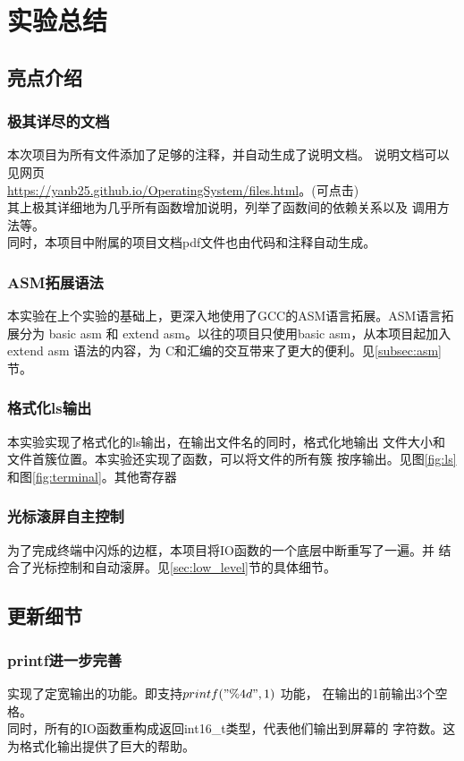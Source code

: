 \documentclass[a4paper]{article}
\begin{document}
\section{实验总结}
    \subsection{亮点介绍}
    \subsubsection{极其详尽的文档}
    本次项目为所有文件添加了足够的注释，并自动生成了说明文档。
    说明文档可以见网页\\ 

    \url{https://yanb25.github.io/OperatingSystem/files.html}。(可点击) \\

    其上极其详细地为几乎所有函数增加说明，列举了函数间的依赖关系以及
    调用方法等。\\
    
    同时，本项目中附属的项目文档pdf文件也由代码和注释自动生成。
    \subsubsection{ASM拓展语法}
    本实验在上个实验的基础上，更深入地使用了GCC的ASM语言拓展。ASM语言拓展分为
    basic asm 和 extend asm。以往的项目只使用basic asm，从本项目起加入extend asm
    语法的内容，为
    C和汇编的交互带来了更大的便利。见\ref{subsec:asm}节。
    \subsubsection{格式化ls输出}
    本实验实现了格式化的ls输出，在输出文件名的同时，格式化地输出
    文件大小和文件首簇位置。本实验还实现了函数，可以将文件的所有簇
    按序输出。见图\ref{fig:ls}和图\ref{fig:terminal}。其他寄存器
    \subsubsection{光标滚屏自主控制}
    为了完成终端中闪烁的边框，本项目将IO函数的一个底层中断重写了一遍。并
    结合了光标控制和自动滚屏。见\ref{sec:low_level}节的具体细节。

    \subsection{更新细节}
    \subsubsection{printf进一步完善}
    实现了定宽输出的功能。即支持$ printf("\%4d", 1) $ 功能，
    在输出的1前输出3个空格。
    \\
    同时，所有的IO函数重构成返回int16\_t类型，代表他们输出到屏幕的
    字符数。这为格式化输出提供了巨大的帮助。
\end{document}
